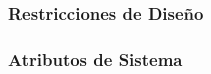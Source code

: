 \documentclass{article}
\begin{document}







        \subsubsection{Restricciones de Diseño}





        \subsubsection{Atributos de Sistema}









\end{document}
